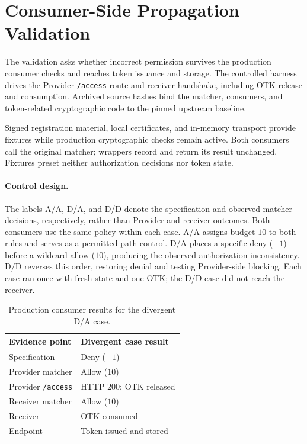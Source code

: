 \section{Consumer-Side Propagation Validation}
\label{sec:consumer-propagation}
\label{sec:evaluation}

The validation asks whether incorrect permission survives the production
consumer checks and reaches token issuance and storage. The controlled
harness drives the Provider \texttt{/access} route and receiver handshake,
including OTK release and consumption. Archived source hashes bind the
matcher, consumers, and token-related cryptographic code to the pinned
upstream baseline.

Signed registration material, local certificates, and in-memory transport
provide fixtures while production cryptographic checks remain active. Both
consumers call the original matcher; wrappers record and return its result
unchanged. Fixtures preset neither authorization decisions nor token state.

\paragraph{Control design.}
The labels A/A, D/A, and D/D denote the specification and observed matcher
decisions, respectively, rather than Provider and receiver outcomes. Both
consumers use the same policy within each case. A/A assigns budget $10$ to both
rules and serves as a permitted-path control. D/A places a specific deny
($-1$) before a wildcard allow ($10$), producing the observed authorization
inconsistency. D/D reverses this order, restoring denial and testing
Provider-side blocking. Each case ran once with fresh state and one OTK;
the D/D case did not reach the receiver.

\begin{table}[htb]
\caption{Production consumer results for the divergent D/A case.}
\label{tab:consumer-propagation}
\centering
\small
\begin{tabular}{@{}ll@{}}
\hline
Evidence point & Divergent case result \\
\hline
Specification & Deny ($-1$) \\
Provider matcher & Allow ($10$) \\
Provider \texttt{/access} & HTTP 200; OTK released \\
Receiver matcher & Allow ($10$) \\
Receiver & OTK consumed \\
Endpoint & Token issued and stored \\
\hline
\end{tabular}
\end{table}

